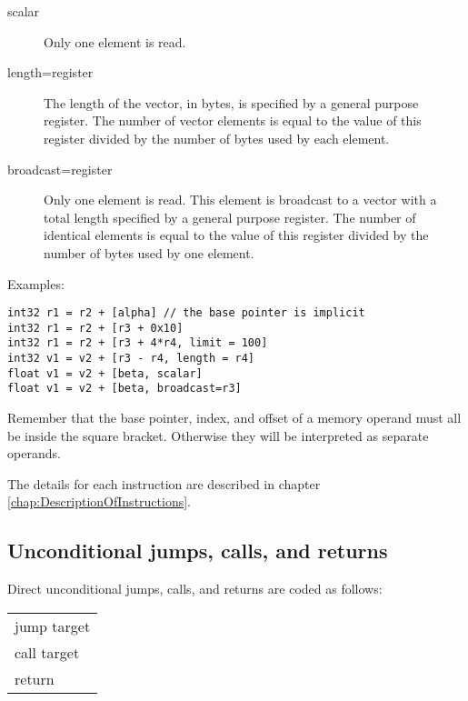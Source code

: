 \documentclass[forwardcom.tex]{subfiles}
\begin{document}
\begin{description}

\item[scalar]
Only one element is read.

\item[length=register]
The length of the vector, in bytes, is specified by a general purpose register. 
The number of vector elements is equal to the value of this register divided by the number of bytes used by each element.

\item[broadcast=register]
Only one element is read. This element is broadcast to a vector with a total length specified by a general purpose register. The number of identical elements is equal to the value of this register divided by the number of bytes used by one element.

\end{description}
\vspace{4mm}


Examples:
\vv

\begin{lstlisting}[frame=single]
int32 r1 = r2 + [alpha] // the base pointer is implicit
int32 r1 = r2 + [r3 + 0x10]
int32 r1 = r2 + [r3 + 4*r4, limit = 100]
int32 v1 = v2 + [r3 - r4, length = r4]
float v1 = v2 + [beta, scalar]
float v1 = v2 + [beta, broadcast=r3]
\end{lstlisting}
\vv

Remember that the base pointer, index, and offset of a memory operand must all be inside the square bracket. Otherwise they will be interpreted as separate operands.
\vv

The details for each instruction are described in chapter \ref{chap:DescriptionOfInstructions}.
\vv


\subsection{Unconditional jumps, calls, and returns} \label{assemblyJumps}
Direct unconditional jumps, calls, and  returns are coded as follows:
\vv

\begin{tabular}{|p{140mm}|}
\hline
\hspace{4mm} jump target\\
\hspace{4mm} call target\\
\hspace{4mm} return\\
\hline
\end{tabular}
\vv
\end{document}
